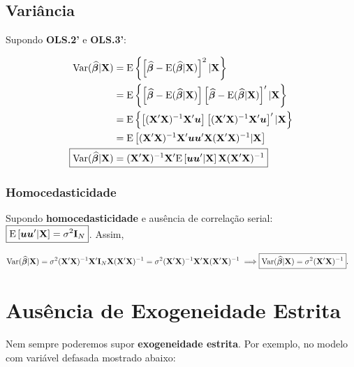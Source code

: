 \documentclass[11pt, oneside, a4paper, article]{article}
\numberwithin{equation}{section}
\begin{document}
\subsection{Variância} 
Supondo \textbf{OLS.2'} e \textbf{OLS.3'}:

\vspace{-1 em}
\begin{align*} 
\Var ( \widehat{\betavec} | \Xmat) 
&= \E \left\{\left[ 
\widehat{\betavec} - \E ( \widehat{\betavec} | \Xmat )
\right]^2 | \Xmat \right\}
\\
&= \E \left\{ 
\left[ \widehat{\betavec} - \E ( \widehat{\betavec} | \Xmat ) \right]
\left[ \widehat{\betavec} - \E ( \widehat{\betavec} | \Xmat ) \right]'
| \Xmat \right\}
\\
&= \E \left\{ 
\left[ (\Xmat'\Xmat)^{-1}\Xmat' \uvec \right]
\left[ (\Xmat'\Xmat)^{-1}\Xmat' \uvec \right]'
| \Xmat \right\}
\\
&= \E \left[ (\Xmat'\Xmat)^{-1}\Xmat' \uvec \uvec' \Xmat (\Xmat'\Xmat)^{-1} | \Xmat \right]
\\
\Aboxed{
\Var ( \widehat{\betavec} | \Xmat) 
&= 
(\Xmat'\Xmat)^{-1}\Xmat' 
\E \left[ \uvec \uvec'| \Xmat \right]
\Xmat (\Xmat'\Xmat)^{-1} }
\end{align*}

\subsubsection{Homocedasticidade}
Supondo \textbf{homocedasticidade} e ausência de correlação serial: 
$\boxed{ \text{E} \left[ \boldsymbol{u} \boldsymbol{u}'| \mathbf{X} \right] = \sigma^2 \mathbf{I}_{N} }$.
Assim, 

\vspace{-1 em}
\begin{align*} 
\Var ( \widehat{\betavec} | \Xmat) 
= \sigma^2 (\Xmat'\Xmat)^{-1}\Xmat' \Imat_{N} \Xmat (\Xmat'\Xmat)^{-1}
= \sigma^2 (\Xmat'\Xmat)^{-1}\Xmat'\Xmat (\Xmat'\Xmat)^{-1}
\implies
\Aboxed{ \Var ( \widehat{\betavec} | \Xmat) &= \sigma^2 (\Xmat'\Xmat)^{-1} }.
\end{align*}

\clearpage
\section{Ausência de Exogeneidade Estrita}
Nem sempre poderemos supor \textbf{exogeneidade estrita}.
Por exemplo, no modelo com variável defasada mostrado abaixo:
\end{document}
